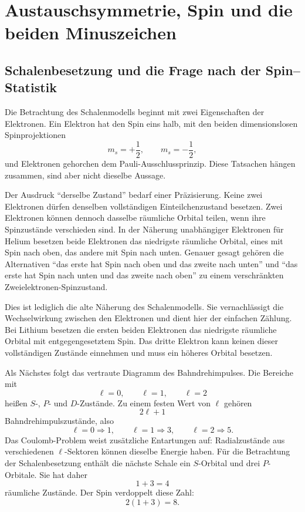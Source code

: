 \chapter{Austauschsymmetrie, Spin und die beiden Minuszeichen}

\section{Schalenbesetzung und die Frage nach der Spin--Statistik}

Die Betrachtung des Schalenmodells beginnt mit zwei Eigenschaften der Elektronen. Ein Elektron hat den Spin eins halb, mit den beiden dimensionslosen Spinprojektionen
\begin{equation}
m_s=+\frac12,
\qquad
m_s=-\frac12,
\end{equation}
und Elektronen gehorchen dem Pauli-Ausschlussprinzip. Diese Tatsachen hängen zusammen, sind aber nicht dieselbe Aussage.

Der Ausdruck ``derselbe Zustand'' bedarf einer Präzisierung. Keine zwei Elektronen dürfen denselben vollständigen Einteilchenzustand besetzen. Zwei Elektronen können dennoch dasselbe räumliche Orbital teilen, wenn ihre Spinzustände verschieden sind. In der Näherung unabhängiger Elektronen für Helium besetzen beide Elektronen das niedrigste räumliche Orbital, eines mit Spin nach oben, das andere mit Spin nach unten. Genauer gesagt gehören die Alternativen ``das erste hat Spin nach oben und das zweite nach unten'' und ``das erste hat Spin nach unten und das zweite nach oben'' zu einem verschränkten Zweielektronen-Spinzustand.

Dies ist lediglich die alte Näherung des Schalenmodells. Sie vernachlässigt die Wechselwirkung zwischen den Elektronen und dient hier der einfachen Zählung. Bei Lithium besetzen die ersten beiden Elektronen das niedrigste räumliche Orbital mit entgegengesetztem Spin. Das dritte Elektron kann keinen dieser vollständigen Zustände einnehmen und muss ein höheres Orbital besetzen.

Als Nächstes folgt das vertraute Diagramm des Bahndrehimpulses. Die Bereiche mit
\begin{equation}
\ell=0,\qquad \ell=1,\qquad \ell=2
\end{equation}
heißen \(S\)-, \(P\)- und \(D\)-Zustände. Zu einem festen Wert von \(\ell\) gehören
\begin{equation}
2\ell+1
\end{equation}
Bahndrehimpulszustände, also
\begin{equation}
\ell=0\Rightarrow 1,
\qquad
\ell=1\Rightarrow 3,
\qquad
\ell=2\Rightarrow 5.
\end{equation}
Das Coulomb-Problem weist zusätzliche Entartungen auf: Radialzustände aus verschiedenen \(\ell\)-Sektoren können dieselbe Energie haben. Für die Betrachtung der Schalenbesetzung enthält die nächste Schale ein \(S\)-Orbital und drei \(P\)-Orbitale. Sie hat daher
\begin{equation}
1+3=4
\end{equation}
räumliche Zustände. Der Spin verdoppelt diese Zahl:
\begin{equation}
2(1+3)=8.
\end{equation}

